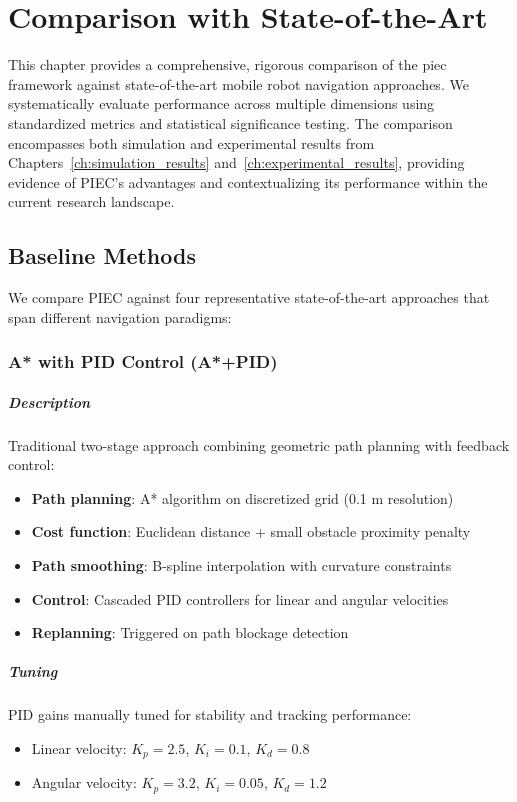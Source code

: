 \chapter{Comparison with State-of-the-Art}
\label{ch:comparison}

This chapter provides a comprehensive, rigorous comparison of the \acrfull{piec} framework against state-of-the-art mobile robot navigation approaches. We systematically evaluate performance across multiple dimensions using standardized metrics and statistical significance testing. The comparison encompasses both simulation and experimental results from Chapters~\ref{ch:simulation_results} and~\ref{ch:experimental_results}, providing evidence of PIEC's advantages and contextualizing its performance within the current research landscape.

\section{Baseline Methods}
\label{sec:baseline_methods}

We compare PIEC against four representative state-of-the-art approaches that span different navigation paradigms:

\subsection{A* with PID Control (A*+PID)}

\paragraph{Description}
Traditional two-stage approach combining geometric path planning with feedback control:
\begin{itemize}
    \item \textbf{Path planning}: A* algorithm on discretized grid (0.1 m resolution)
    \item \textbf{Cost function}: Euclidean distance + small obstacle proximity penalty
    \item \textbf{Path smoothing}: B-spline interpolation with curvature constraints
    \item \textbf{Control}: Cascaded PID controllers for linear and angular velocities
    \item \textbf{Replanning}: Triggered on path blockage detection
\end{itemize}

\paragraph{Tuning}
PID gains manually tuned for stability and tracking performance:
\begin{itemize}
    \item Linear velocity: $K_p = 2.5$, $K_i = 0.1$, $K_d = 0.8$
    \item Angular velocity: $K_p = 3.2$, $K_i = 0.05$, $K_d = 1.2$
\end{itemize}

